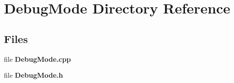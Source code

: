 \section{Debug\+Mode Directory Reference}
\label{dir_63d60da9205426450f28b97d384ddd81}
\subsection*{Files}
\begin{DoxyCompactItemize}
\item 
file {\bfseries Debug\+Mode.\+cpp}
\item 
file {\bfseries Debug\+Mode.\+h}
\end{DoxyCompactItemize}
